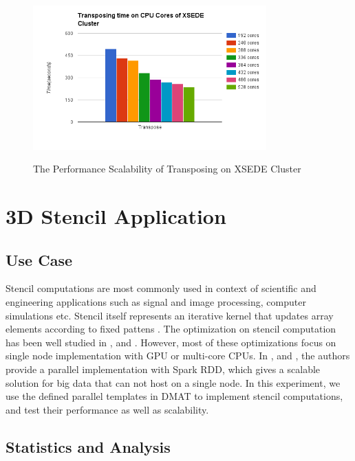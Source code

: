\begin{figure}[h]
\centering
\includegraphics[width=0.8\textwidth]{figures/XSEDETest.png}\\
\caption{The Performance Scalability of Transposing on XSEDE Cluster }\label{XSEDETest}
\end{figure}


\section{3D Stencil Application}

\subsection{Use Case}

Stencil computations are most commonly used in context of scientific and engineering applications such as signal and image processing, computer simulations etc.
Stencil itself represents an iterative kernel that updates array elements according to fixed pattens \cite{StencilWiki}. The optimization on stencil computation has been well studied in \cite{Han2011PADS},\cite{Nguyen2010Blocking} and \cite{Datta2008Stencil}. 
However, most of these optimizations focus on single node implementation with GPU or multi-core CPUs. In \cite{YanMasterThesis}, \cite{7363985} and \cite{7396203}, the authors provide a parallel implementation with Spark RDD, which gives a scalable solution for big data that can not host on a single node. 
In this experiment, we use the defined parallel templates in DMAT to implement stencil computations, and test their performance as well as scalability.

\subsection{Statistics and Analysis}

